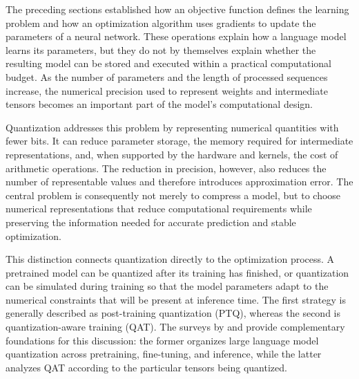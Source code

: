 %

The preceding sections established how an objective function defines the
learning problem and how an optimization algorithm uses gradients to update
the parameters of a neural network. These operations explain how a language
model learns its parameters, but they do not by themselves explain whether
the resulting model can be stored and executed within a practical
computational budget. As the number of parameters and the length of
processed sequences increase, the numerical precision used to represent
weights and intermediate tensors becomes an important part of the model's
computational design.

Quantization addresses this problem by representing numerical quantities
with fewer bits. It can reduce parameter storage, the memory required for
intermediate representations, and, when supported by the hardware and
kernels, the cost of arithmetic operations. The reduction in precision,
however, also reduces the number of representable values and therefore
introduces approximation error. The central problem is consequently not
merely to compress a model, but to choose numerical representations that
reduce computational requirements while preserving the information needed
for accurate prediction and stable optimization.

This distinction connects quantization directly to the optimization
process. A pretrained model can be quantized after its training has
finished, or quantization can be simulated during training so that the
model parameters adapt to the numerical constraints that will be present
at inference time. The first strategy is generally described as
post-training quantization (PTQ), whereas the second is quantization-aware
training (QAT). The surveys by \textcite{chen2026llmquantization} and
\textcite{song2026targetcentricqat} provide complementary foundations for
this discussion: the former organizes large language model quantization
across pretraining, fine-tuning, and inference, while the latter analyzes
QAT according to the particular tensors being quantized.

